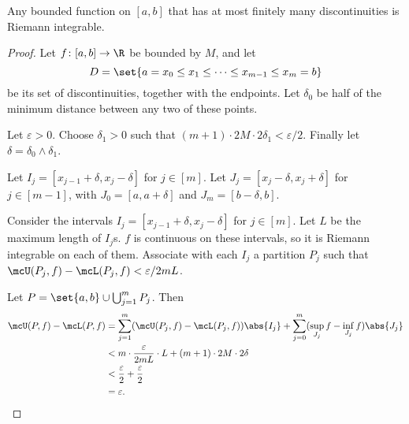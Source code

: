 \begin{exercise}
    Any bounded function on $[a, b]$ that has at most finitely many
    discontinuities is Riemann integrable.
\end{exercise}
\begin{proof}
    Let $f\colon [a, b] \to \R$ be bounded by $M$, and
    let \[
        D = \set{a = x_0 \le x_1 \le \dots \le x_{m-1} \le x_m = b}
    \] be its set of discontinuities, together with the endpoints.
    Let $\delta_0$ be half of the minimum distance between any two of these
    points.

    Let $\varepsilon > 0$.
    Choose $\delta_1 > 0$ such that
    $(m+1) \cdot 2M \cdot 2\delta_1 < \varepsilon/2$.
    Finally let $\delta = \delta_0 \wedge \delta_1$.

    Let $I_j = [x_{j-1} + \delta, x_j - \delta]$ for $j \in [m]$.
    Let $J_j = [x_j - \delta, x_j + \delta]$ for $j \in [m-1]$,
    with $J_0 = [a, a + \delta]$ and $J_m = [b - \delta, b]$.

    Consider the intervals $I_j = [x_{j-1} + \delta, x_j - \delta]$ for
    $j \in [m]$.
    Let $L$ be the maximum length of $I_j$s.
    $f$ is continuous on these intervals, so it is Riemann integrable on
    each of them.
    Associate with each $I_j$ a partition $P_j$ such that
    $\mcU(P_j, f) - \mcL(P_j, f) < \varepsilon/2mL$.

    Let $P = \set{a, b} \cup \bigcup_{j=1}^m P_j$.
    Then \begin{align*}
        \mcU(P, f) - \mcL(P, f)
            &= \sum_{j=1}^m (\mcU(P_j, f) - \mcL(P_j, f)) \abs{I_j}
                + \sum_{j=0}^m (\sup_{J_j} f - \inf_{J_j} f) \abs{J_j} \\
            &< m \cdot \frac{\varepsilon}{2mL} \cdot L
                + (m+1) \cdot 2M \cdot 2\delta \\
            &< \frac{\varepsilon}{2} + \frac{\varepsilon}{2} \\
            &= \varepsilon. \qedhere
    \end{align*}
\end{proof}

